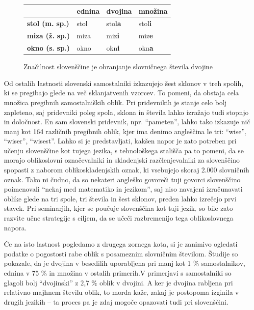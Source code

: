 \begin{multicols}{2}
\begin{figure}[htb]
\begin{tabularx}{\textwidth}{ |X|X|X|X| }
  \hline
   & \textbf{ednina} & \textbf{dvojina} & \textbf{množina} \\ 
  \hline
  \textbf{stol (m. sp.)}   & stol     &  stol\textbf{a}  & stol\textbf{i} \\ 
  \hline
  \textbf{miza (ž. sp.)}   & miza     &  miz\textbf{i}  & miz\textbf{e} \\ 
  \hline
  \textbf{okno (s. sp.)}   & okno     &  okn\textbf{i}  & okn\textbf{a} \\
  \hline
  \end{tabularx}
  \caption{Značilnost slovenščine je ohranjanje slovničnega števila dvojine}
  \label{fig:dvojina}
\end{figure}

Od ostalih lastnosti slovenski samostalniki izkazujejo šest sklonov v treh spolih, ki se pregibajo glede na več sklanjatvenih vzorcev. To po\-meni, da obstaja cela množica pregibnih samostalniških oblik. Pri pridevnikih je stanje celo bolj zapleteno, saj pridevniki poleg spola, sklona in števila lahko izražajo tudi stopnjo in določnost. En sam slovenski pridevnik, npr. “pameten”, lahko tako izkazuje nič manj kot 164 različnih pregibnih oblik, kjer ima denimo angleščina le tri: ``wise'', ``wiser'', ``wisest''. Lahko si je predstav\-ljati, kakšen napor je zato potreben pri učenju slovenščine kot tujega jezika, s tehnološkega stališča pa to po\-meni, da se morajo oblikoslovni označevalniki in skladenjski razčlenjevalniki za slovenščino spopasti z naborom oblikoskladenjskih oznak, ki vsebujejo skoraj 2.000 slovničnih oznak. Tako ni čudno, da so nekateri angleško go\-voreči tuji go\-vorci slovenščino poimenovali “nekaj med matema\-tiko in jezikom”, saj niso navajeni izračunavati oblike glede na tri spole, tri števila in šest sklonov, preden lahko izrečejo prvi stavek. Pri seminarjih, kjer se poučuje slovenščina kot tuji jezik, so bile zato razvite učne strategije s ciljem, da se učeči razbremenijo tega oblikoslovnega napora. 

Če na isto lastnost pogledamo z drugega zornega kota, si je zanimivo ogledati podatke o pogostosti rabe oblik s posameznim slovničnim številom. Študije so pokazale, da je dvojina v besedilih uporab\-ljena pri manj kot 1 \% samostalnikov, ednina v 75 \% in množina v ostalih primerih.V primerjavi s samostalniki so glagoli bolj “dvojinski” z 2,7 \% oblik v dvojini. A ker je dvojina rab\-ljena pri relativno majhnem številu oblik, to morda kaže, zakaj je postopoma izginila v drugih jezikih – ta proces pa je zdaj mogoče opazovati tudi pri slovenščini.



\end{multicols}
